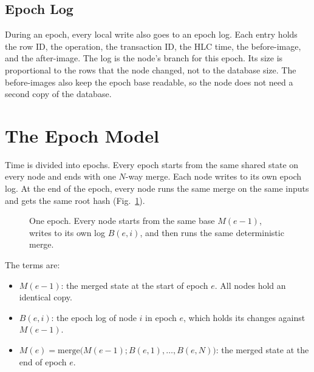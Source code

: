 \documentclass[journal]{IEEEtran}
\begin{document}
\subsection{Epoch Log}
During an epoch, every local write also goes to an epoch log. Each entry holds the row ID, the operation, the transaction ID, the HLC time, the before-image, and the after-image. The log is the node's branch for this epoch. Its size is proportional to the rows that the node changed, not to the database size. The before-images also keep the epoch base readable, so the node does not need a second copy of the database.

\section{The Epoch Model}
Time is divided into epochs. Every epoch starts from the same shared state on every node and ends with one $N$-way merge. Each node writes to its own epoch log. At the end of the epoch, every node runs the same merge on the same inputs and gets the same root hash (Fig.~\ref{fig:epoch}).

\begin{figure}[t]
\centering
{}
\caption{One epoch. Every node starts from the same base $M(e{-}1)$, writes to its own log $B(e,i)$, and then runs the same deterministic merge.}\label{fig:epoch}
\end{figure}

The terms are:
\begin{itemize}
\item $M(e{-}1)$: the merged state at the start of epoch $e$. All nodes hold an identical copy.
\item $B(e,i)$: the epoch log of node $i$ in epoch $e$, which holds its changes against $M(e{-}1)$.
\item $M(e)=\mathrm{merge}\bigl(M(e{-}1);B(e,1),\dots,B(e,N)\bigr)$: the merged state at the end of epoch $e$.
\end{itemize}
\end{document}
